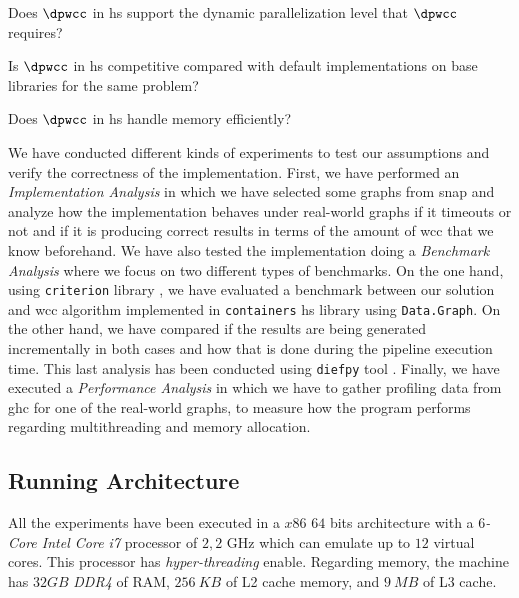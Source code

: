 \begin{inparaenum}[\bf {\bf RQ}1\upshape)]
\label{res:question}
    \item Does $\dpwcc$ in \acrshort{hs} support the dynamic parallelization level that $\dpwcc$ requires?
    \item Is $\dpwcc$ in \acrshort{hs} competitive compared with default implementations on base libraries for the same problem?
    \item Does $\dpwcc$ in \acrshort{hs} handle memory efficiently?
\end{inparaenum}

We have conducted different kinds of experiments to test our assumptions and verify the correctness of the implementation.
First, we have performed an \emph{Implementation Analysis} in which we have selected some graphs from \acrfull{snap} \cite{stanford} and analyze how the implementation behaves under real-world graphs if it timeouts or not and if it is producing correct results in terms of the amount of \acrshort{wcc} that we know beforehand.
We have also tested the implementation doing a \emph{Benchmark Analysis} where we focus on two different types of benchmarks. On the one hand, using \texttt{criterion} library \cite{criterion}, we have evaluated a benchmark between our solution and \acrshort{wcc} algorithm implemented in \texttt{containers} \acrshort{hs} library \cite{containers} using \texttt{Data.Graph}. On the other hand, we have compared if the results are being generated incrementally in both cases and how that is done during the pipeline execution time. This last analysis has been conducted using \texttt{diefpy} tool \cite{diefpaper,diefpy}.
Finally, we have executed a \textit{Performance Analysis} in which we have to gather profiling data from \acrfull{ghc} for one of the real-world graphs, to measure how the program performs regarding multithreading and memory allocation.

\subsection{Running Architecture}
All the experiments have been executed in a $x86$ $64$ bits architecture with a \textit{$6$-Core Intel Core i7} processor of $2,2$ GHz which can emulate up to $12$ virtual cores. This processor has \emph{hyper-threading} enable. Regarding memory, the machine has $32 GB$ \emph{DDR4} of RAM, $256\ KB$ of L2 cache memory, and $9\ MB$ of L3 cache.

